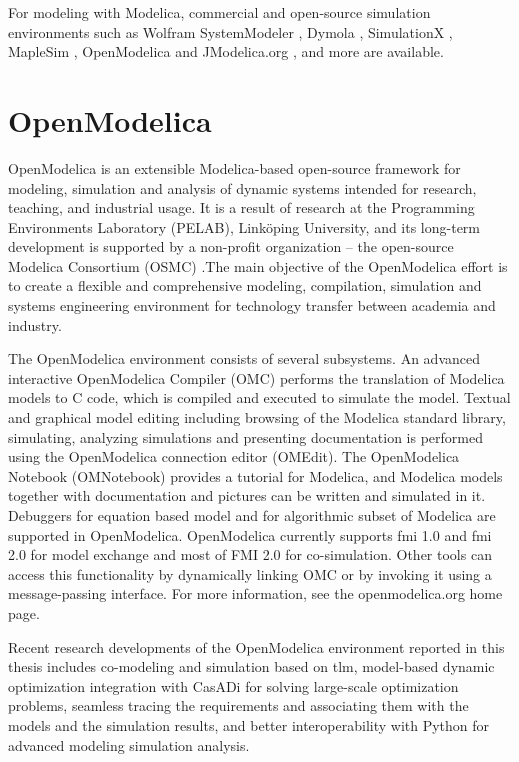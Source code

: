 For modeling with Modelica, commercial and open-source simulation environments such as Wolfram SystemModeler \cite{wolfram, wolframmats, wolframpeter}, Dymola \cite{dymola, dymoladag}, SimulationX \cite{simulationx}, MapleSim \cite{maplesim}, OpenModelica \cite{openmodelica,openmodelicapeter} and JModelica.org \cite{jmodelica},  and more are available. 


\section{OpenModelica}
\label{sec:openmodelica}

OpenModelica \cite{openmodelica,openmodelicapeter} is an extensible Modelica-based open-source framework for modeling, simulation and analysis of dynamic systems intended for research, teaching, and industrial usage. It is a result of research at the Programming Environments Laboratory (PELAB), Link\"{o}ping University, and its long-term development is supported by a non-profit organization – the open-source Modelica Consortium (OSMC) \cite{osmc}.The main objective of the OpenModelica effort is to create a flexible and comprehensive modeling, compilation, simulation and systems engineering environment for technology transfer between academia and industry.

The OpenModelica environment consists of several subsystems. An advanced interactive OpenModelica Compiler (OMC) performs the translation of Modelica models to C code, which is compiled and executed to simulate the model.  Textual and graphical model editing including browsing of the Modelica standard library, simulating, analyzing simulations and presenting documentation is performed using the OpenModelica connection editor (OMEdit). The OpenModelica Notebook (OMNotebook) provides a tutorial for Modelica, and Modelica models together with documentation and pictures can be written and simulated in it. Debuggers for equation based model and for algorithmic subset of Modelica are supported in OpenModelica.  OpenModelica currently supports \acrshort{fmi} 1.0 and \acrshort{fmi} 2.0 for model exchange and most of FMI 2.0 for co-simulation. Other tools can access this functionality by dynamically linking OMC or by invoking it using a message-passing interface. For more information, see the openmodelica.org\cite{openmodelica} home page.

Recent research developments of the OpenModelica environment reported in this thesis includes co-modeling and simulation based on \acrshort{tlm}, model-based dynamic optimization integration with CasADi \cite{casadi} for solving large-scale optimization problems, seamless tracing the requirements and associating them with the models and the simulation results,  and better  interoperability with Python for advanced modeling simulation analysis.


